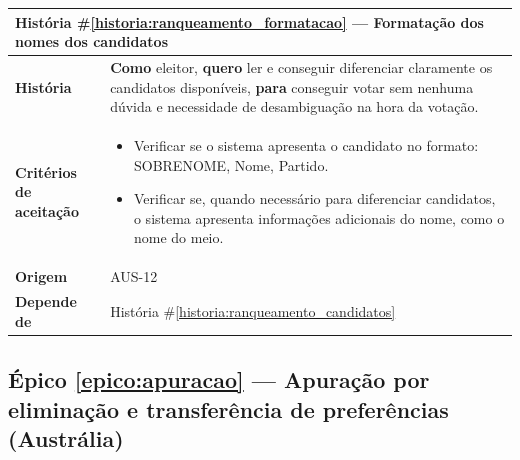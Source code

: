 \documentclass[12pt,a4paper]{article}
\newcounter{epico}
\newcounter{historia}
\begin{document}
\label{historia:ranqueamento_formatacao}
\begin{table}[H]
    \centering
    \begin{tabular}{|m{4.5cm}|m{11cm}|}
    \hline

    \multicolumn{2}{|l|}{
        \textbf{História \#\ref{historia:ranqueamento_formatacao} --- Formatação dos nomes dos candidatos}
    } \\

    \hline

    \textbf{História} &
    \textbf{Como} eleitor,
    \newline
    \textbf{quero} ler e conseguir diferenciar claramente os candidatos disponíveis,
    \newline
    \textbf{para} conseguir votar sem nenhuma dúvida e necessidade de desambiguação na hora da votação. \\

    \textbf{Critérios de aceitação} &
    \begin{itemize}
        \item{Verificar se o sistema apresenta o candidato no formato: SOBRENOME, Nome, Partido.}
        \item{Verificar se, quando necessário para diferenciar candidatos, o sistema apresenta informações adicionais do nome, como o nome do meio.}
    \end{itemize}\\
    
    \textbf{Origem} &
    AUS-12 \\

    \textbf{Depende de} &
    História \#\ref{historia:ranqueamento_candidatos} \\

    \hline
    \end{tabular}
\end{table}

\label{epico:apuracao}
\subsection*{Épico \ref{epico:apuracao} --- Apuração por eliminação e transferência de preferências (Austrália)}
\end{document}
